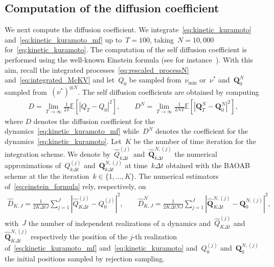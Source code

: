 \documentclass[onefignum,onetabnum]{siamart251216} %
\newcommand{\expect}{\mathbb E}
\newcommand{\mc}[1]{\mathcal{#1}}
\theoremstyle{plain}
\numberwithin{equation}{section}
\numberwithin{theorem}{section}
\begin{document}
\subsection{Computation of the diffusion coefficient}
\label{subsec:computation_diffusion}
We next compute the diffusion coefficient. We integrate~\eqref{eq:kinetic_kuramoto} and~\eqref{eq:kinetic_kuramoto_mf} up to~$T = 100$, taking~$N = 10,000$ for~\eqref{eq:kinetic_kuramoto}. The computation of the self diffusion coefficient is performed using the well-known Einstein formula (see for instance~\cite{rodenhausen1989}). With this aim, recall the integrated processes~\eqref{eq:rescaled_processN} and~\eqref{eq:integrated_McKV} and let~$Q_0$ be sampled from~$\nu_{\min}$ or~$\nu^*$ and~$\textbf{Q}_0^N$ sampled from~$(\nu^*)^{\otimes N}$. The self diffusion coefficients are obtained by computing
\begin{align}
    \label{eq:einstein_formula}
    D = \lim_{T\to\infty}\frac{1}{2T}\expect\!\left[\left|Q_T-Q_0\right|^2\right],\qquad D^N = \lim_{T\to\infty}\frac{1}{2NT}\expect\!\left[\left|\textbf{Q}_T^N-\textbf{Q}_0^N\right|^2\right],
\end{align}
 where $D$ denotes the diffusion coefficient for the dynamics~\eqref{eq:kinetic_kuramoto_mf} while~$D^N$ denotes the coefficient for the dynamics~\eqref{eq:kinetic_kuramoto}.
Let~$K$ be the number of time iteration for the integration scheme. We denote by~$\widehat{Q}_{k\Delta t}^{(j)}$ and~$\widehat{\textbf{Q}}_{k\Delta t}^{N,(j)}$ the numerical approximations of~$Q_{k\Delta t}^{(j)}$ and~$\textbf{Q}_{k\Delta t}^{N,(j)}$ at time~$k\Delta t$ obtained with the BAOAB scheme at the the iteration~$k\in\{1,\dots,K\}$.
The numerical estimators of~\eqref{eq:einstein_formula} rely, respectively, on
\begin{align}
    \widehat{D}_{K,J} = \frac{1}{2K\Delta tJ}\sum_{j=1}^{J}\left|\widehat{Q}_{K\Delta t}^{(j)}-Q_0^{(j)}\right|^2,\qquad \widehat{D}_{K,J}^N = \frac{1}{2K\Delta tNJ}\sum_{j=1}^{J}\left|\widehat{\textbf{Q}}_{K\Delta t}^{N,(j)}-{\textbf{Q}}_0^{N,(j)}\right|^2,
    \label{eq:einstein_formula_estimator}
\end{align}
with~$J$ the number of independent realizations of a dynamics and~$\widehat{Q}_{K\Delta t}^{(j)}$ and~$\widehat{\textbf{Q}}_{K\Delta t}^{N,(j)}$ respectively the position of the $j$-th realization of~\eqref{eq:kinetic_kuramoto_mf} and~\eqref{eq:kinetic_kuramoto} and~$Q_0^{(j)}$ and~${\textbf{Q}}_0^{N,(j)}$ the initial positions sampled by rejection sampling. 
\end{document}

